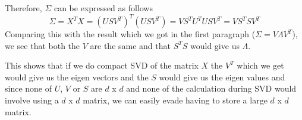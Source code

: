 \documentclass[twoside]{article}
\begin{document}
Therefore, $\Sigma$ can be expressed as follows
\begin{equation*}
	\Sigma = X^T X = (USV^T)^T(USV^T) = VS^TU^TUSV^T = VS^TSV^T
\end{equation*}
Comparing this with the result which we got in the first paragraph ($\Sigma = V \Lambda V^T$), we see that both the $V$ are the same and that $S^TS$ would give us $\Lambda$.

This shows that if we do compact SVD of the matrix $X$ the $V^T$ which we get would give us the eigen vectors and the $S$ would give us the eigen values and since none of $U$, $V$ or $S$ are $d$ x $d$ and none of the calculation during SVD would involve using a $d$ x $d$ matrix, we can easily evade having to store a large $d$ x $d$ matrix.
\end{document}
